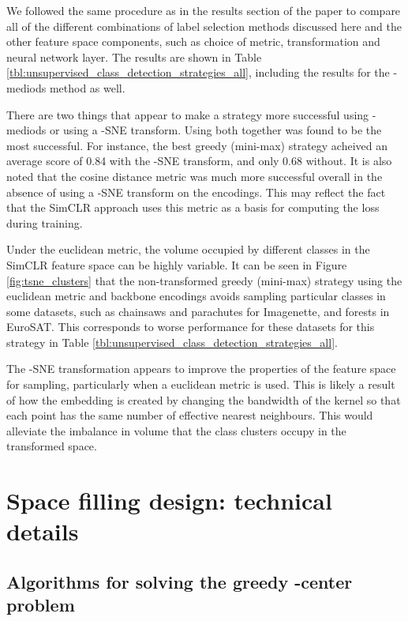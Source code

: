 \documentclass{article}
\begin{document}
We followed the same procedure as in the results section of the paper to compare all of the different combinations of label selection methods discussed here and the other feature space components, such as choice of metric, transformation and neural network layer. The results are shown in Table \ref{tbl:unsupervised_class_detection_strategies_all}, including the results for the -mediods method as well.

There are two things that appear to make a strategy more successful \textemdash{} using -mediods or using a -SNE transform. Using both together was found to be the most successful. For instance, the best greedy (mini-max) strategy acheived an average score of 0.84 with the -SNE transform, and only 0.68 without. It is also noted that the cosine distance metric was much more successful overall in the absence of using a -SNE transform on the encodings. This may reflect the fact that the SimCLR approach uses this metric as a basis for computing the loss during training. 

Under the euclidean metric, the volume occupied by different classes in the SimCLR feature space can be highly variable. It can be seen in Figure \ref{fig:tsne_clusters} that the non-transformed greedy (mini-max) strategy using the euclidean metric and backbone encodings avoids sampling particular classes in some datasets, such as chainsaws and parachutes for Imagenette, and forests in EuroSAT. This corresponds to worse performance for these datasets for this strategy in Table \ref{tbl:unsupervised_class_detection_strategies_all}.

The -SNE transformation appears to improve the properties of the feature space for sampling, particularly when a euclidean metric is used. This is likely a result of how the embedding is created \textemdash{} by changing the bandwidth of the kernel so that each point has the same number of effective nearest neighbours. This would alleviate the imbalance in volume that the class clusters occupy in the transformed space.



\section{Space filling design: technical details}
\label{sec:space_filling_design}
\subsection{Algorithms for solving the greedy -center problem}
\end{document}

